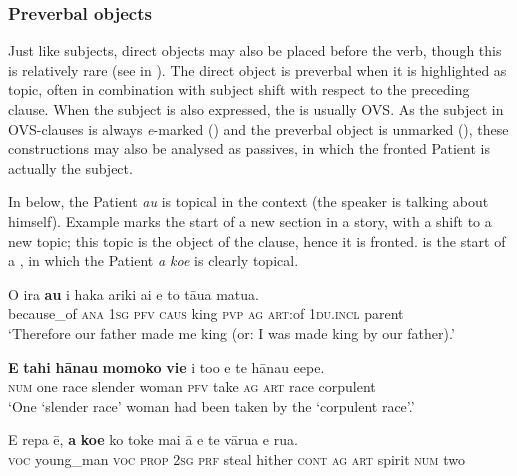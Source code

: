 \subsubsection[Preverbal objects]{Preverbal objects}\label{sec:8.6.1.2}
Just like subjects, direct objects may also be placed before the verb, though this is relatively rare (see  in ). The direct object is preverbal when it is highlighted as topic, often in combination with subject shift with respect to the preceding clause. When the subject is also expressed, the  is usually OVS. As the subject in OVS-clauses is always \textit{e}{}-marked () and the preverbal object is unmarked (), these constructions may also be analysed as passives, in which the fronted Patient is actually the subject. 

In  below, the Patient \textit{au} is topical in the context (the speaker is talking about himself). Example  marks the start of a new section in a story, with a shift to a new topic; this topic is the object of the clause, hence it is fronted.  is the start of a , in which the Patient \textit{a koe} is clearly topical.

\ea\label{ex:8.75}
\gll {\ꞌ}O ira \textbf{au} i haka {\ꞌ}ariki ai e to tāua matu{\ꞌ}a. \\
because\_of \textsc{ana} \textsc{1sg} \textsc{pfv} \textsc{caus} king \textsc{pvp} \textsc{ag} \textsc{art}:of \textsc{1du.incl} parent \\

\glt 
‘Therefore our father made me king (or: I was made king by our father).’ \textstyleExampleref{[Ley-2-06.036]}
\z

\ea\label{ex:8.76}
\gll \textbf{E} \textbf{tahi} \textbf{hānau} \textbf{momoko} \textbf{vi{\ꞌ}e} i to{\ꞌ}o e te hānau {\ꞌ}e{\ꞌ}epe. \\
\textsc{num} one race slender woman \textsc{pfv} take \textsc{ag} \textsc{art} race corpulent \\

\glt 
‘One ‘slender race’ woman had been taken by the ‘corpulent race’.’ \textstyleExampleref{[Ley-3-06.020]}
\z

\ea\label{ex:8.77}
\gll E repa ē, \textbf{a} \textbf{koe} ko toke mai {\ꞌ}ā e te vārua e rua. \\
\textsc{voc} young\_man \textsc{voc} \textsc{prop} \textsc{2sg} \textsc{prf} steal hither \textsc{cont} \textsc{ag} \textsc{art} spirit \textsc{num} two \\

